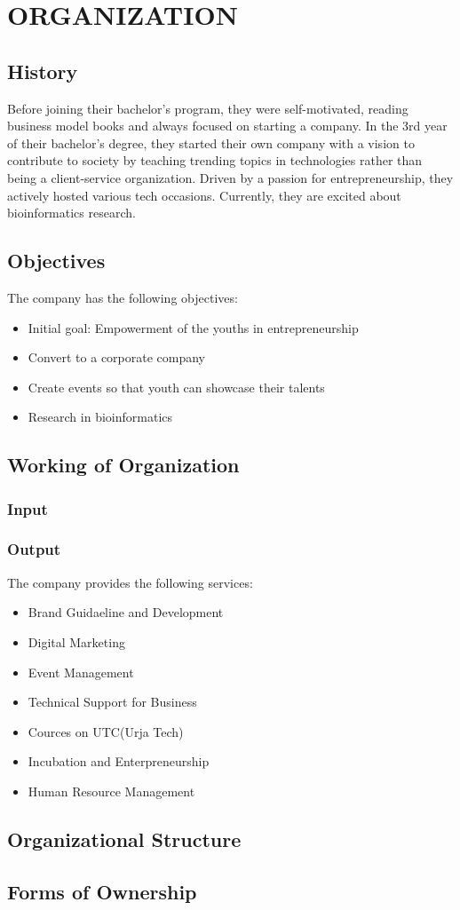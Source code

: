 
\chapter{ORGANIZATION}
      \section{History}
      Before joining their bachelor's program, they were self-motivated, reading business model books and always focused on starting a company. In the 3rd year of their bachelor's degree, they started their own company with a vision to contribute to society by teaching trending topics in technologies rather than being a client-service organization. Driven by a passion for entrepreneurship, they actively hosted various tech occasions. Currently, they are excited about bioinformatics research.
      
      \section{Objectives}
      The company has the following objectives:
      \begin{itemize}
        \item Initial goal: Empowerment of the youths in entrepreneurship
        \item Convert to a corporate company
        \item Create events so that youth can showcase their talents
        \item Research in bioinformatics
      \end{itemize}

      \section{Working of Organization}
      \subsection{Input}

      \subsection{Output}
      The company provides the following services:
      \begin{itemize}
        \item Brand Guidaeline and Development
        \item Digital Marketing
        \item Event Management
        \item Technical Support for Business
        \item Cources on UTC(Urja Tech)
        \item Incubation and Enterpreneurship
        \item Human Resource Management
      \end{itemize}

      \section{Organizational Structure}

      \section{Forms of Ownership}
